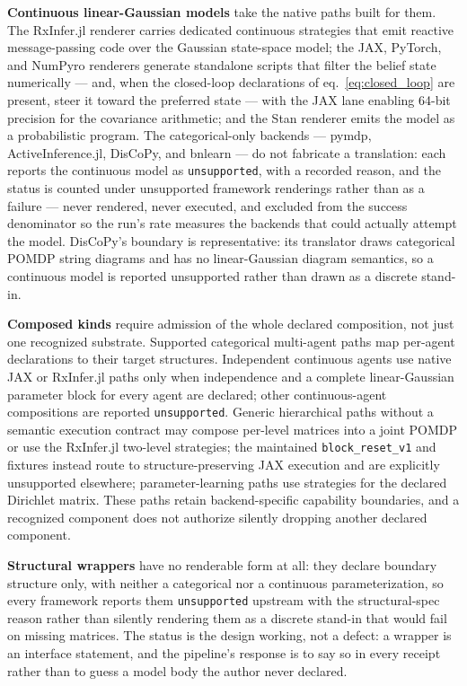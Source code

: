 \documentclass[
  english,
  9pt,
]{extarticle}
\begin{document}
\textbf{Continuous linear-Gaussian models} take the native paths built
for them. The RxInfer.jl renderer carries dedicated continuous
strategies that emit reactive message-passing code over the Gaussian
state-space model; the JAX, PyTorch, and NumPyro renderers generate
standalone scripts that filter the belief state numerically --- and,
when the closed-loop declarations of eq.~\ref{eq:closed_loop} are
present, steer it toward the preferred state --- with the JAX lane
enabling 64-bit precision for the covariance arithmetic; and the Stan
renderer emits the model as a probabilistic program. The
categorical-only backends --- pymdp, ActiveInference.jl, DisCoPy, and
bnlearn --- do not fabricate a translation: each reports the continuous
model as \texttt{unsupported}, with a recorded reason, and the status is
counted under unsupported framework renderings rather than as a failure
--- never rendered, never executed, and excluded from the success
denominator so the run's rate measures the backends that could actually
attempt the model. DisCoPy's boundary is representative: its translator
draws categorical POMDP string diagrams and has no linear-Gaussian
diagram semantics, so a continuous model is reported unsupported rather
than drawn as a discrete stand-in.

\textbf{Composed kinds} require admission of the whole declared
composition, not just one recognized substrate. Supported categorical
multi-agent paths map per-agent declarations to their target structures.
Independent continuous agents use native JAX or RxInfer.jl paths only
when independence and a complete linear-Gaussian parameter block for
every agent are declared; other continuous-agent compositions are
reported \texttt{unsupported}. Generic hierarchical paths without a
semantic execution contract may compose per-level matrices into a joint
POMDP or use the RxInfer.jl two-level strategies; the maintained
\texttt{block\_reset\_v1} and 
fixtures instead route to structure-preserving JAX execution and are
explicitly unsupported elsewhere; parameter-learning paths use
strategies for the declared Dirichlet matrix. These paths retain
backend-specific capability boundaries, and a recognized component does
not authorize silently dropping another declared component.

\textbf{Structural wrappers} have no renderable form at all: they
declare boundary structure only, with neither a categorical nor a
continuous parameterization, so every framework reports them
\texttt{unsupported} upstream with the structural-spec reason rather
than silently rendering them as a discrete stand-in that would fail on
missing matrices. The status is the design working, not a defect: a
wrapper is an interface statement, and the pipeline's response is to say
so in every receipt rather than to guess a model body the author never
declared.
\end{document}
